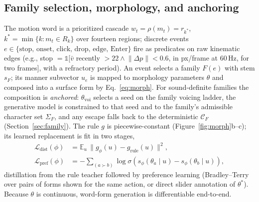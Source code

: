 \documentclass[sigconf,nonacm]{acmart}
\begin{document}
\subsection{Family selection, morphology, and anchoring}
The motion word is a prioritized cascade $w_t = \rho(m_t) = r_{k^*}$, $k^* = \min\{k : m_t \in R_k\}$ over fourteen regions; discrete events $e \in \{\textrm{stop, onset, click, drop, edge, Enter}\}$ fire as predicates on raw kinematic edges (e.g., stop $=\mathbb{1}[\bar v$ recently ${>}22 \wedge \lVert\Delta p\rVert{<}0.6$, in px/frame at 60\,Hz, for two frames$]$, with a refractory period). An event selects a family $F(e)$ with stem $s_F$; its manner subvector $u_e$ is mapped to morphology parameters $\theta$ and composed into a surface form by Eq.~\ref{eq:morph}. For sound-definite families the composition is \emph{anchored}: $\theta_{\mathrm{voi}}$ selects a seed on the family voicing ladder, the generative model is constrained to that seed and to the family's admissible character set $\Sigma_F$, and any escape falls back to the deterministic $\mathcal{C}_F$ (Section~\ref{sec:family}). The rule $g$ is piecewise-constant (Figure~\ref{fig:morph}b--c); its learned replacement is fit in two stages,
\begin{align}
\mathcal{L}_{\mathrm{dist}}(\phi) &= \mathbb{E}_{u}\,\bigl\lVert g_\phi(u) - g_{\mathrm{rule}}(u) \bigr\rVert^2,
\label{eq:morphloss}\\
\mathcal{L}_{\mathrm{pref}}(\phi) &= -\!\!\sum_{(a \succ b)}\!\! \log \sigma\!\left(s_\phi(\theta_a \mid u) - s_\phi(\theta_b \mid u)\right), \nonumber
\end{align}
distillation from the rule teacher followed by preference learning (Bradley--Terry over pairs of forms shown for the same action, or direct slider annotation of $\theta^\ast$). Because $\theta$ is continuous, word-form generation is differentiable end-to-end.
\end{document}
